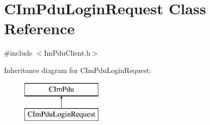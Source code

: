 \hypertarget{class_c_im_pdu_login_request}{}\section{C\+Im\+Pdu\+Login\+Request Class Reference}
\label{class_c_im_pdu_login_request}


{\ttfamily \#include $<$Im\+Pdu\+Client.\+h$>$}

Inheritance diagram for C\+Im\+Pdu\+Login\+Request\+:\begin{figure}[H]
\begin{center}
\leavevmode
\includegraphics[height=2.000000cm]{class_c_im_pdu_login_request}
\end{center}
\end{figure}
